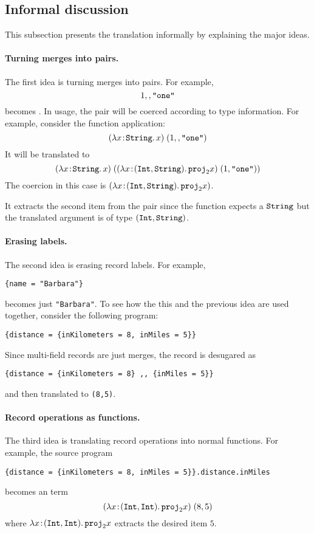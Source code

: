 \subsection{Informal discussion}

This subsection presents the translation informally by explaining the major
ideas.

\paragraph{Turning merges into pairs.}
The first idea is turning merges into pairs. For example,
\[
1 ,, \texttt {"one"}
\]
becomes  {}.
In usage, the pair will be coerced according to type information. For example,
consider the function application:
\[
(\lambda x \!:\! \texttt {String}.\, x) \; (1 ,, \texttt {"one"})
\]
It will be translated to
\[
(\lambda x \!:\! \texttt {String}.\, x) \; ((\lambda x \!:\! (\texttt {Int}, \texttt {String}).\, {\texttt {proj}}_{2} x) \; (1, \texttt {"one"}))
\]
The coercion in this case is $(\lambda x \!:\! (\texttt {Int}, \texttt {String}).\, {\texttt {proj}}_{2} x)$.

\noindent It extracts the second item from the pair since the function expects a $\texttt {String}$
but the translated argument is of type $(\texttt {Int}, \texttt {String})$.

\paragraph{Erasing labels.}
The second idea is erasing record labels. For example,
\begin{lstlisting}
{name = "Barbara"}
\end{lstlisting}
becomes just \lstinline{"Barbara"}.
To see how the this and the previous idea are used together, consider the following program:
\begin{lstlisting}
{distance = {inKilometers = 8, inMiles = 5}}
\end{lstlisting}
Since multi-field records are just merges, the record is desugared as
\begin{lstlisting}
{distance = {inKilometers = 8} ,, {inMiles = 5}}
\end{lstlisting}
and then translated to \lstinline{(8,5)}.

\paragraph{Record operations as functions.}
The third idea is translating record operations into normal functions. For
example, the source program
\begin{lstlisting}
{distance = {inKilometers = 8, inMiles = 5}}.distance.inMiles
\end{lstlisting}
becomes an \name term
\[
(\lambda x \!:\! (\texttt {Int}, \texttt {Int}).\, {\texttt {proj}}_{2} x) \; (8, 5)
\]
where $\lambda x \!:\! (\texttt {Int}, \texttt {Int}).\, {\texttt {proj}}_{2} x$
extracts the desired item $5$.

